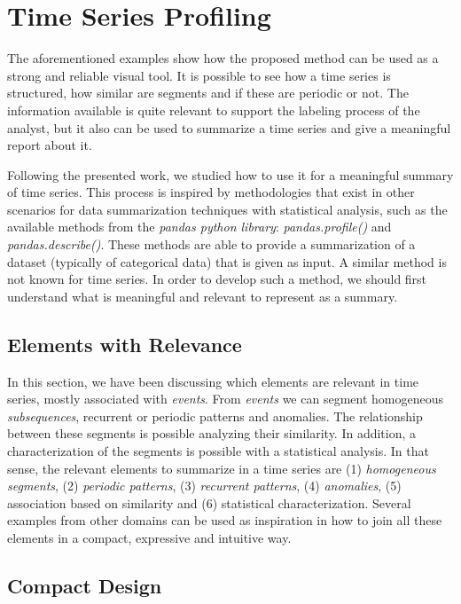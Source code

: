 {\section{Time Series Profiling}

The aforementioned examples show how the proposed method can be used as a strong and reliable visual tool. It is possible to see how a time series is structured, how similar are segments and if these are periodic or not. The information available is quite relevant to support the labeling process of the analyst, but it also can be used to summarize a time series and give a meaningful report about it. 
\par
Following the presented work, we studied how to use it for a meaningful summary of time series. This process is inspired by methodologies that exist in other scenarios for data summarization techniques with statistical analysis, such as the available methods from the \textit{pandas python library}: \textit{pandas.profile()} and \textit{pandas.describe()}. These methods are able to provide a summarization of a dataset (typically of categorical data) that is given as input. A similar method is not known for time series. In order to develop such a method, we should first understand what is meaningful and relevant to represent as a summary.

\subsection{Elements with Relevance}

In this section, we have been discussing which elements are relevant in time series, mostly associated with \textit{events}. From \textit{events} we can segment homogeneous \textit{subsequences}, recurrent or periodic patterns and anomalies. The relationship between these segments is possible analyzing their similarity. In addition, a characterization of the segments is possible with a statistical analysis. In that sense, the relevant elements to summarize in a time series are (1) \textit{homogeneous segments}, (2) \textit{periodic patterns}, (3) \textit{recurrent patterns}, (4) \textit{anomalies}, (5) association based on similarity and (6) statistical characterization. Several examples from other domains can be used as inspiration in how to join all these elements in a compact, expressive and intuitive way.

\subsection{Compact Design}

}
